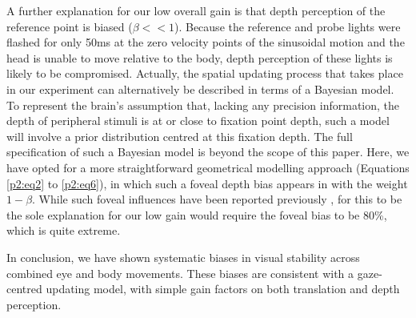 A further explanation for our low overall gain is that depth perception of the reference point is biased ($\beta << 1$). Because the reference and probe lights were flashed for only 50ms at the zero velocity points of the sinusoidal motion and the head is unable to move relative to the body, depth perception of these lights is likely to be compromised. Actually, the spatial updating process that takes place in our experiment can alternatively be described in terms of a Bayesian model. To represent the brain's assumption that, lacking any precision information, the depth of peripheral stimuli is at or close to fixation point depth, such a model will involve a prior distribution centred at this fixation depth. The full specification of such a Bayesian model is beyond the scope of this paper. Here, we have opted for a more straightforward geometrical modelling approach (Equations \ref{p2:eq2} to \ref{p2:eq6}), in which such a foveal depth bias appears in  with the weight $1 - \beta$. While such foveal influences have been reported previously \cite{brenner2008, mateeff1983}, for this to be the sole explanation for our low gain would require the foveal bias to be 80\%, which is quite extreme.

In conclusion, we have shown systematic biases in visual stability across combined eye and body movements. These biases are consistent with a gaze-centred updating model, with simple gain factors on both translation and depth perception.  

